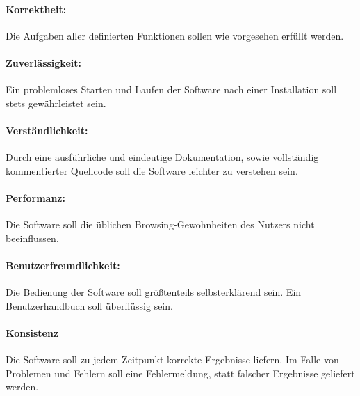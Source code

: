 \documentclass[11pt]{scrreprt}
\begin{document}
\paragraph{Korrektheit:} Die Aufgaben aller definierten Funktionen sollen wie vorgesehen erfüllt werden.

\paragraph{Zuverlässigkeit:} Ein problemloses Starten und Laufen der Software nach einer Installation soll stets gewährleistet sein.

\paragraph{Verständlichkeit:} Durch eine ausführliche und eindeutige Dokumentation, sowie vollständig kommentierter Quellcode soll die Software leichter zu verstehen sein.

\paragraph{Performanz:} Die Software soll die üblichen Browsing-Gewohnheiten des Nutzers nicht beeinflussen.

\paragraph{Benutzerfreundlichkeit:} Die Bedienung der Software soll größtenteils selbsterklärend sein. Ein Benutzerhandbuch soll überflüssig sein.

\paragraph{Konsistenz} Die Software soll zu jedem Zeitpunkt korrekte Ergebnisse liefern. Im Falle von Problemen und Fehlern soll eine Fehlermeldung, statt falscher Ergebnisse geliefert werden.
\end{document}
